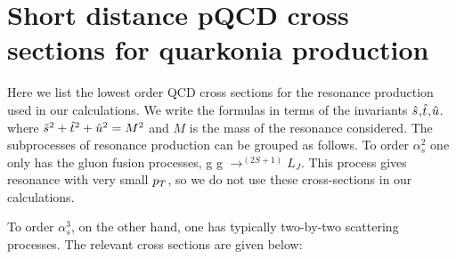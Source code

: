 \documentclass[aps,prc,preprint,superscriptaddress,showpacs,showkeys,amsmath]{revtex4-1}
\begin{document}
\section{Short distance pQCD cross sections for quarkonia production}
\label{section:pqcd}
Here we list the lowest order QCD cross sections for the resonance production used 
in our calculations. We write the formulas in terms of the invariants ${\hat{s}}$,${\hat{t}}$,${\hat{u}}$.
where ${\hat{s}}^2 + {\hat{t}}^2 + {\hat{u}}^2 = M^2$ and $M$ is the mass of the resonance considered.
The subprocesses of resonance production can be
grouped as follows.
To order $\alpha_{s}^{2}$ one only has the
gluon fusion processes, g g $\rightarrow ^{(2S+1)}L_{J}$. This 
process gives resonance with very small $p_{T}$, so we do not 
use these cross-sections in our calculations.

To order $\alpha_{s}^{3}$, on the other hand, one has typically
two-by-two scattering processes. The relevant cross
sections are given below:
\end{document}
